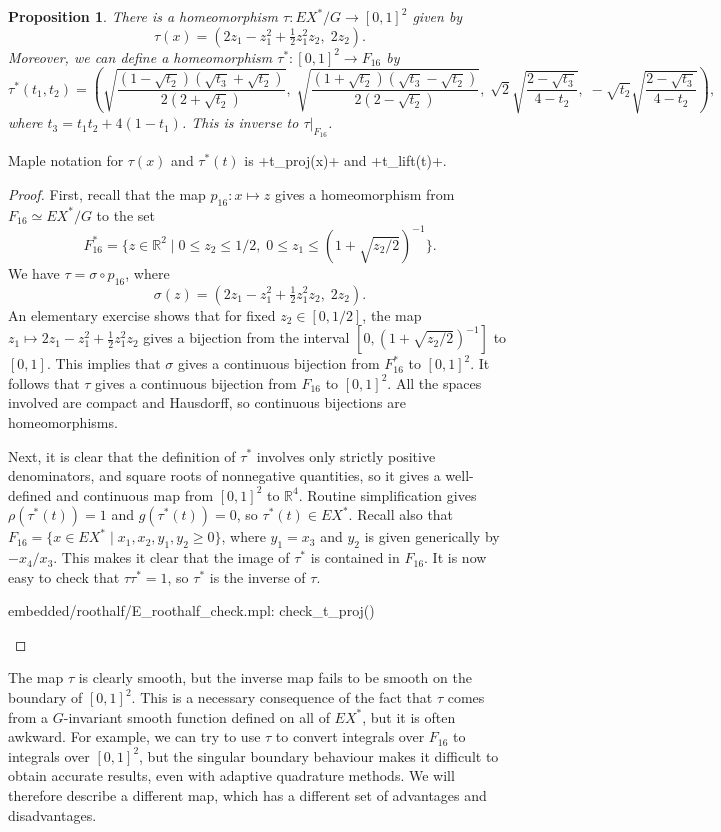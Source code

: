 \documentclass[reqno]{amsart}
\newcommand{\sg}        {\sigma}
\newcommand{\R}         {{\mathbb{R}}}
\newcommand{\st}        {\;|\;}
\newcommand{\half}      {\tfrac{1}{2}}
\newcommand{\rt}        {\sqrt{2}}
\renewcommand{\:}{\colon}
\newtheorem{proposition}[theorem]{Proposition}
\theoremstyle{definition}
\begin{document}
\begin{proposition}
 There is a homeomorphism $\tau\:EX^*/G\to [0,1]^2$ given by
 \[ \tau(x) = (2z_1-z_1^2+\half z_1^2z_2,\;2z_2). \]
 Moreover, we can define a homeomorphism $\tau^*\:[0,1]^2\to F_{16}$ by
 \[ \tau^*(t_1,t_2) = \left(
     \sqrt{\frac{(1-\sqrt{t_2})(\sqrt{t_3}+\sqrt{t_2})}{2(2+\sqrt{t_2})}},\;
     \sqrt{\frac{(1+\sqrt{t_2})(\sqrt{t_3}-\sqrt{t_2})}{2(2-\sqrt{t_2})}},\;
     \rt\sqrt{\frac{2-\sqrt{t_3}}{4-t_2}},\;
     -\sqrt{t_2}\sqrt{\frac{2-\sqrt{t_3}}{4-t_2}}
    \right),
 \]
 where $t_3=t_1t_2+4(1-t_1)$.  This is inverse to $\tau|_{F_{16}}$.
\end{proposition}
Maple notation for $\tau(x)$ and $\tau^*(t)$ is \mcode+t_proj(x)+ and
\mcode+t_lift(t)+.
\begin{proof}
 First, recall that the map $p_{16}\:x\mapsto z$ gives a homeomorphism
 from $F_{16}\simeq EX^*/G$ to the set
 \[ F^*_{16} = \{z\in \R^2\st 0\leq z_2\leq 1/2,\;
                0\leq z_1\leq (1+\sqrt{z_2/2})^{-1}\}.
 \]
 We have $\tau=\sg\circ p_{16}$, where
 \[ \sg(z) = (2z_1-z_1^2+\half z_1^2z_2,\;2z_2). \]
 An elementary exercise shows that for fixed $z_2\in[0,1/2]$, the map
 $z_1\mapsto 2z_1-z_1^2+\half z_1^2z_2$ gives a bijection from the
 interval $[0,(1+\sqrt{z_2/2})^{-1}]$ to $[0,1]$.  This implies that
 $\sg$ gives a continuous bijection from $F^*_{16}$ to $[0,1]^2$.  It
 follows that $\tau$ gives a continuous bijection from $F_{16}$ to
 $[0,1]^2$.  All the spaces involved are compact and Hausdorff, so
 continuous bijections are homeomorphisms.

 Next, it is clear that the definition of $\tau^*$ involves only
 strictly positive denominators, and square roots of nonnegative
 quantities, so it gives a well-defined and continuous map from
 $[0,1]^2$ to $\R^4$.  Routine simplification gives
 $\rho(\tau^*(t))=1$ and $g(\tau^*(t))=0$, so $\tau^*(t)\in EX^*$.
 Recall also that $F_{16}=\{x\in EX^*\st x_1,x_2,y_1,y_2\geq 0\}$,
 where $y_1=x_3$ and $y_2$ is given generically by $-x_4/x_3$.  This
 makes it clear that the image of $\tau^*$ is contained in $F_{16}$.
 It is now easy to check that $\tau\tau^*=1$, so $\tau^*$ is the
 inverse of $\tau$.
 \begin{checks}
  embedded/roothalf/E_roothalf_check.mpl: check_t_proj()
 \end{checks}
\end{proof}

The map $\tau$ is clearly smooth, but the inverse map fails to be
smooth on the boundary of $[0,1]^2$.  This is a necessary consequence
of the fact that $\tau$ comes from a $G$-invariant smooth function
defined on all of $EX^*$, but it is often awkward.  For example, we
can try to use $\tau$ to convert integrals over $F_{16}$ to integrals
over $[0,1]^2$, but the singular boundary behaviour makes it difficult
to obtain accurate results, even with adaptive quadrature methods.  We
will therefore describe a different map, which has a different set of
advantages and disadvantages.
\end{document}
